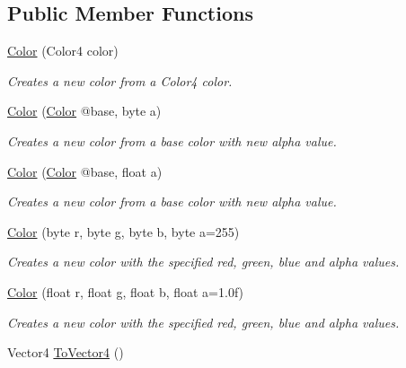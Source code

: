 \subsection*{Public Member Functions}
\begin{DoxyCompactItemize}
\item 
\hyperlink{struct_tri_devs_1_1_tri_engine2_d_1_1_color_a305818ecf8b2bf7f0fa0d1118e4482cc}{Color} (Color4 color)
\begin{DoxyCompactList}\small\item\em Creates a new color from a Color4 color. \end{DoxyCompactList}\item 
\hyperlink{struct_tri_devs_1_1_tri_engine2_d_1_1_color_acc210e6ef544077a32f3961964b84075}{Color} (\hyperlink{struct_tri_devs_1_1_tri_engine2_d_1_1_color}{Color} @base, byte a)
\begin{DoxyCompactList}\small\item\em Creates a new color from a base color with new alpha value. \end{DoxyCompactList}\item 
\hyperlink{struct_tri_devs_1_1_tri_engine2_d_1_1_color_aca2024f149e13eca7952d0fc4ccb7e14}{Color} (\hyperlink{struct_tri_devs_1_1_tri_engine2_d_1_1_color}{Color} @base, float a)
\begin{DoxyCompactList}\small\item\em Creates a new color from a base color with new alpha value. \end{DoxyCompactList}\item 
\hyperlink{struct_tri_devs_1_1_tri_engine2_d_1_1_color_aa51fbba2aa6493f35bd3480828f506c9}{Color} (byte r, byte g, byte b, byte a=255)
\begin{DoxyCompactList}\small\item\em Creates a new color with the specified red, green, blue and alpha values. \end{DoxyCompactList}\item 
\hyperlink{struct_tri_devs_1_1_tri_engine2_d_1_1_color_a2a9e220f22b3904ee73d693d55e9e375}{Color} (float r, float g, float b, float a=1.\-0f)
\begin{DoxyCompactList}\small\item\em Creates a new color with the specified red, green, blue and alpha values. \end{DoxyCompactList}\item 
Vector4 \hyperlink{struct_tri_devs_1_1_tri_engine2_d_1_1_color_ab35423a11d824b24afb63049f53d1868}{To\-Vector4} ()

\end{DoxyCompactItemize}
